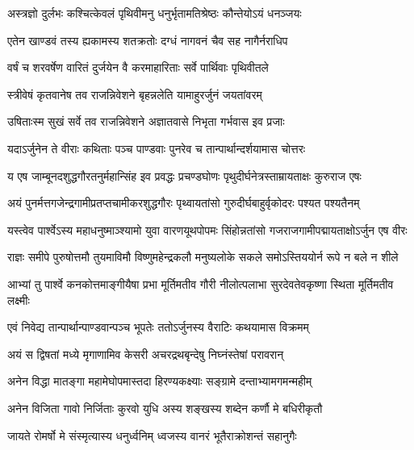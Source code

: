 
\twolineshloka
{अस्त्रज्ञो दुर्लभः कश्चित्केवलं पृथिवीमनु}
{धनुर्भृतामतिश्रेष्ठः कौन्तेयोऽयं धनञ्जयः}


\twolineshloka
{एतेन खाण्डवं तस्य ह्यकामस्य शतक्रतोः}
{दग्धं नागवनं चैव सह नागैर्नराधिप}


\twolineshloka
{वर्षं च शरवर्षेण वारितं दुर्जयेन वै}
{करमाहारिताः सर्वे पार्थिवाः पृथिवीतले}


\twolineshloka
{स्त्रीवेषं कृतवानेष तव राजन्निवेशने}
{बृहन्नलेति यामाहुरर्जुनं जयतांवरम्}


\twolineshloka
{उषिताःस्म सुखं सर्वे तव राजन्निवेशने}
{अज्ञातवासे निभृता गर्भवास इव प्रजाः}



\twolineshloka
{यदाऽर्जुनेन ते वीराः कथिताः पञ्च पाण्डवाः}
{पुनरेव च तान्पार्थान्दर्शयामास चोत्तरः}




\twolineshloka
{य एष जाम्बूनदशुद्धगौरतनुर्महान्सिंह इव प्रवद्धः}
{प्रचण्डघोणः पृथुदीर्घनेत्रस्ताम्रायताक्षः कुरुराज एषः}


\twolineshloka
{अयं पुनर्मत्तगजेन्द्रगामीप्रतप्तचामीकरशुद्धगौरः}
{पृथ्वायतांसो गुरुदीर्घबाहुर्वृकोदरः पश्यत पश्यतैनम्}


\twolineshloka
{यस्त्वेव पार्श्वेऽस्य महाधनुष्माञ्श्यामो युवा वारणयूथपोपमः}
{सिंहोन्नतांसो गजराजगामीपद्मायताक्षोऽर्जुन एष वीरः}


\twolineshloka
{राज्ञः समीपे पुरुषोत्तमौ तुयमाविमौ विष्णुमहेन्द्रकलौ}
{मनुष्यलोके सकले समोऽस्तिययोर्न रूपे न बले न शीले}


\twolineshloka
{आभ्यां तु पार्श्वे कनकोत्तमाङ्गीयैषा प्रभा मूर्तिमतीव गौरी}
{नीलोत्पलाभा सुरदेवतेवकृष्णा स्थिता मूर्तिमतीव लक्ष्मीः}



\twolineshloka
{एवं निवेद्य तान्पार्थान्पाण्डवान्पञ्च भूपतेः}
{ततोऽर्जुनस्य वैराटिः कथयामास विक्रमम्}


\twolineshloka
{अयं स द्विषतां मध्ये मृगाणामिव केसरी}
{अचरद्रथबृन्देषु निघ्नंस्तेषां परावरान्}


\twolineshloka
{अनेन विद्धा मातङ्गा महामेघोपमास्तदा}
{हिरण्यकक्ष्याः सङ्ग्रामे दन्ताभ्यामगमन्महीम्}


\twolineshloka
{अनेन विजिता गावो निर्जिताः कुरवो युधि}
{अस्य शङ्खस्य शब्देन कर्णौ मे बधिरीकृतौ}


\twolineshloka
{जायते रोमर्षो मे संस्मृत्यास्य धनुर्ध्वनिम्}
{ध्वजस्य वानरं भूतैराक्रोशन्तं सहानुगैः}



